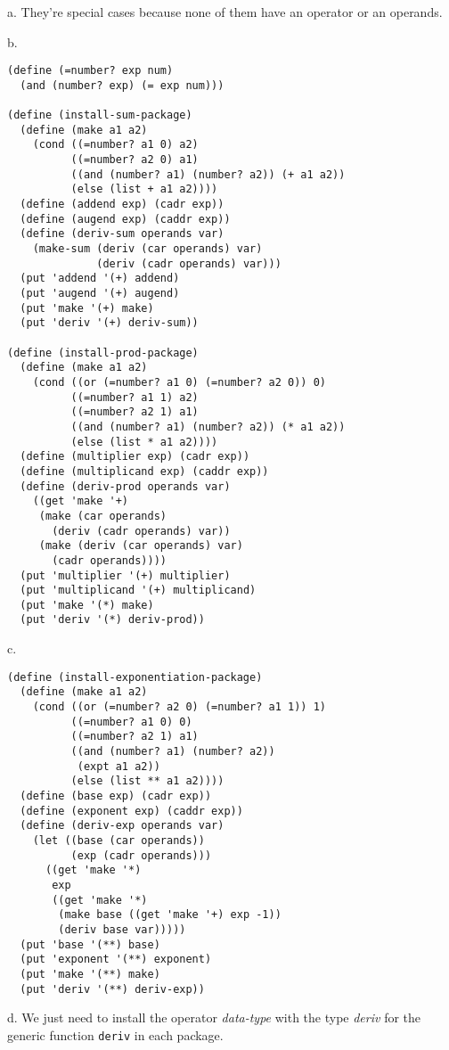 \documentclass[a4paper,12pt]{article}
\newcommand{\subpar}[1] {\medskip \noindent #1.} \lstset{language=Lisp}
\begin{document}
\subpar{a} They're special cases because none of them have an operator
or an operands.

\subpar{b}
\begin{lstlisting}
(define (=number? exp num)
  (and (number? exp) (= exp num)))

(define (install-sum-package)
  (define (make a1 a2)
    (cond ((=number? a1 0) a2)
          ((=number? a2 0) a1)
          ((and (number? a1) (number? a2)) (+ a1 a2))
          (else (list + a1 a2))))
  (define (addend exp) (cadr exp))
  (define (augend exp) (caddr exp))
  (define (deriv-sum operands var)
    (make-sum (deriv (car operands) var)
              (deriv (cadr operands) var)))
  (put 'addend '(+) addend)
  (put 'augend '(+) augend)
  (put 'make '(+) make)
  (put 'deriv '(+) deriv-sum))

(define (install-prod-package)
  (define (make a1 a2)
    (cond ((or (=number? a1 0) (=number? a2 0)) 0)
          ((=number? a1 1) a2)
          ((=number? a2 1) a1)
          ((and (number? a1) (number? a2)) (* a1 a2))
          (else (list * a1 a2))))
  (define (multiplier exp) (cadr exp))
  (define (multiplicand exp) (caddr exp))
  (define (deriv-prod operands var)
    ((get 'make '+)
     (make (car operands)
       (deriv (cadr operands) var))
     (make (deriv (car operands) var)
       (cadr operands))))
  (put 'multiplier '(+) multiplier)
  (put 'multiplicand '(+) multiplicand)
  (put 'make '(*) make)
  (put 'deriv '(*) deriv-prod))
\end{lstlisting}

\subpar{c}
\begin{lstlisting}
(define (install-exponentiation-package)
  (define (make a1 a2)
    (cond ((or (=number? a2 0) (=number? a1 1)) 1)
          ((=number? a1 0) 0)
          ((=number? a2 1) a1)
          ((and (number? a1) (number? a2))
           (expt a1 a2))
          (else (list ** a1 a2))))
  (define (base exp) (cadr exp))
  (define (exponent exp) (caddr exp))
  (define (deriv-exp operands var)
    (let ((base (car operands))
          (exp (cadr operands)))
      ((get 'make '*)
       exp
       ((get 'make '*)
        (make base ((get 'make '+) exp -1))
        (deriv base var)))))
  (put 'base '(**) base)
  (put 'exponent '(**) exponent)
  (put 'make '(**) make)
  (put 'deriv '(**) deriv-exp))
\end{lstlisting}

\subpar{d} We just need to install the operator \emph{data-type} with
the type \emph{deriv} for the generic function
\lstinline!deriv! in each package.
\end{document}
